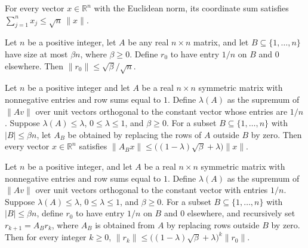 \begin{theorem}
\label{Expander.sum_le_sqrt_mul_norm}
\leanok
{}
For every vector $x\in\mathbb{R}^n$ with the Euclidean norm, its coordinate sum
satisfies $\sum_{j=1}^n x_j\le \sqrt{n}\,\|x\|$.
\end{theorem}

\begin{theorem}
\label{Expander.norm_resVec_zero_le}
\leanok
{}
Let $n$ be a positive integer, let $A$ be any real $n\times n$ matrix, and let
$B\subseteq\{1,\ldots,n\}$ have size at most $\beta n$, where $\beta\ge0$. Define $r_0$
to have entry $1/n$ on $B$ and $0$ elsewhere. Then $\|r_0\|\le\sqrt{\beta}/\sqrt{n}$.
\end{theorem}

\begin{theorem}
\label{Expander.norm_toCLM_resMatrix_le}
\leanok
{}
Let $n$ be a positive integer and let $A$ be a real $n\times n$ symmetric matrix with
nonnegative entries and row sums equal to $1$. Define $\lambda(A)$ as the supremum of
$\|Av\|$ over unit vectors orthogonal to the constant vector whose entries are $1/n$.
Suppose $\lambda(A)\le\lambda$, $0\le\lambda\le1$, and $\beta\ge0$. For a subset
$B\subseteq\{1,\ldots,n\}$ with $|B|\le\beta n$, let $A_B$ be obtained by replacing the
rows of $A$ outside $B$ by zero. Then every vector $x\in\mathbb R^n$ satisfies
$\|A_Bx\|\le\big((1-\lambda)\sqrt{\beta}+\lambda\big)\|x\|$.
\end{theorem}

\begin{theorem}
\label{Expander.norm_resVec_le}
\leanok
{}
Let $n$ be a positive integer, and let $A$ be a real $n\times n$ symmetric matrix with
nonnegative entries and row sums equal to $1$. Define $\lambda(A)$ as the supremum of
$\|Av\|$ over unit vectors orthogonal to the constant vector with entries $1/n$. Suppose
$\lambda(A)\le\lambda$, $0\le\lambda\le1$, and $\beta\ge0$. For a subset
$B\subseteq\{1,\ldots,n\}$ with $|B|\le\beta n$, define $r_0$ to have entry $1/n$ on $B$
and $0$ elsewhere, and recursively set $r_{k+1}=A_Br_k$, where $A_B$ is obtained from
$A$ by replacing rows outside $B$ by zero. Then for every integer $k\ge0$,
$\|r_k\|\le\big((1-\lambda)\sqrt{\beta}+\lambda\big)^k\|r_0\|$.
\end{theorem}

